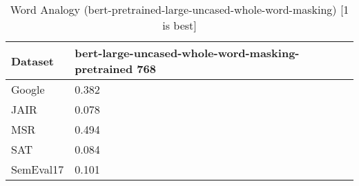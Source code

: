 \begin{table}[]
\centering
\begin{tabular}{l|l}
\hline
Dataset & bert-large-uncased-whole-word-masking-pretrained 768 \\
\hline
Google & 0.382 \\ 
JAIR & 0.078 \\ 
MSR & 0.494 \\ 
SAT & 0.084 \\ 
SemEval17 & 0.101
\end{tabular}
\caption{Word Analogy (bert-pretrained-large-uncased-whole-word-masking) [1 is best]}
\label{tab:analogy-bert-pretrained-large-uncased-whole-word-masking}
\end{table}
